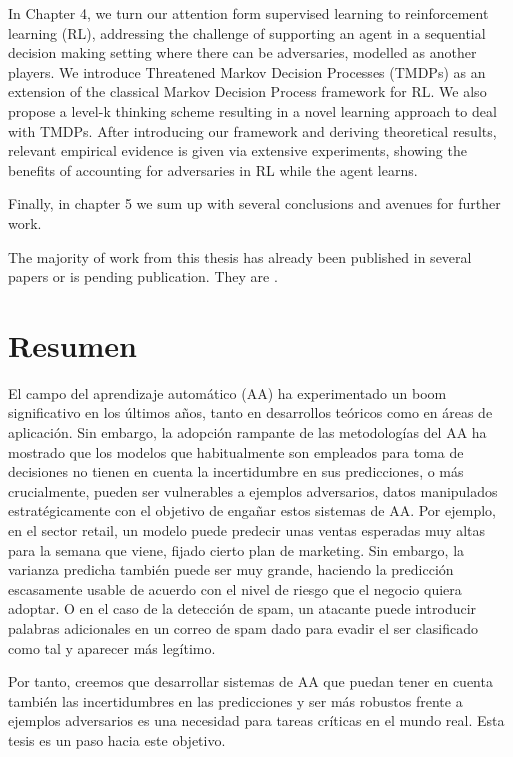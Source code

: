 \documentclass[a4paper, 11pt, openright, twoside]{reportPhD}
\numberwithin{figure}{chapter}
\numberwithin{table}{chapter}
\numberwithin{equation}{chapter}
\begin{document}
In Chapter 4, we turn our attention form supervised learning to reinforcement learning (RL), addressing the challenge of supporting an agent in a sequential decision making setting where there can be adversaries, modelled as another players. We introduce Threatened Markov Decision Processes (TMDPs) as an extension of the classical Markov Decision Process framework for RL. We also propose a level-k thinking scheme resulting in a novel learning approach to deal with TMDPs. After introducing our framework and deriving theoretical results, relevant empirical evidence is given via extensive experiments, showing the benefits of accounting for adversaries in RL while the agent learns.

Finally, in chapter 5 we sum up with several conclusions and avenues for further work.

The majority of work from this thesis has already been published in several papers or is pending publication. They are \parencite{gallego2019dlms,angulo2018bayesian,gallego2019reinforcement,gallego2019opponent,gallego2021data,gallego2019vis,gallego2018stochastic,AMLARA,math8111957,gallego2020protecting}.

\chapter*{Resumen}

El campo del aprendizaje automático (AA) ha experimentado un boom significativo en los últimos años, tanto en desarrollos teóricos como en áreas de aplicación. Sin embargo, la adopción rampante de las metodologías del AA ha mostrado que los modelos que habitualmente son empleados para toma de decisiones no tienen en cuenta la incertidumbre en sus predicciones, o más crucialmente, pueden ser vulnerables a ejemplos adversarios, datos manipulados estratégicamente con el objetivo de engañar estos sistemas de AA. Por ejemplo, en el sector retail, un modelo puede predecir unas ventas esperadas muy altas para la semana que viene, fijado cierto plan de marketing. Sin embargo, la varianza predicha también puede ser muy grande, haciendo la predicción escasamente usable de acuerdo con el nivel de riesgo que el negocio quiera adoptar. O en el caso de la detección de spam, un atacante puede introducir palabras adicionales en un correo de spam dado para evadir el ser clasificado como tal y aparecer más legítimo.

Por tanto, creemos que desarrollar sistemas de AA que puedan tener en cuenta también las incertidumbres en las predicciones y ser más robustos frente a ejemplos adversarios es una necesidad para tareas críticas en el mundo real. Esta tesis es un paso hacia este objetivo.
\end{document}
